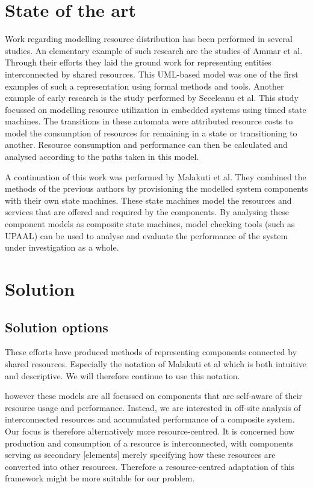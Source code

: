 \section{State of the art}
Work regarding modelling resource distribution has been performed in several studies. An elementary example of such research are the studies of Ammar et al\cite{rum_basis_2}. Through their efforts they laid the ground work for representing entities interconnected by shared resources. This UML-based model was one of the first examples of such a representation using formal methods and tools. Another example of early research is the study performed by Seceleanu et al\cite{rum_basis_89}. This study focussed on modelling resource utilization in embedded systems using timed state machines. The transitions in these automata were attributed resource costs to model the consumption of resources for remaining in a state or transitioning to another. Resource consumption and performance can then be calculated and analysed according to the paths taken in this model.

A continuation of this work was performed by Malakuti et al\cite{steven-te-brinke}. They combined the methods of the previous authors by provisioning the modelled system components with their own state machines. These state machines model the resources and services that are offered and required by the components. By analysing these component models as composite state machines, model checking tools (such as UPAAL\cite{web:upaal}) can be used to analyse and evaluate the performance of the system under investigation as a whole.

\section{Solution}
\subsection{Solution options}
These efforts have produced methods of representing components connected by shared resources. Especially the notation of Malakuti et al\cite{steven-te-brinke} which is both intuitive and descriptive. We will therefore continue to use this notation.

however these models are all focussed on components that are self-aware of their resource usage and performance. Instead, we are interested in off-site analysis of interconnected resources and accumulated performance of a composite system. Our focus is therefore alternatively more resource-centred. It is concerned how production and consumption of a resource is interconnected, with components serving as secondary [elements] merely specifying how these resources are converted into other resources. Therefore a resource-centred adaptation of this framework might be more suitable for our problem.

